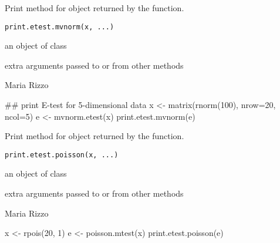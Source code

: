 \documentclass{article}
\begin{document}
\begin{Description}\relax
Print method for  object returned by the 
 function.
\end{Description}
\begin{Usage}
\begin{verbatim}
print.etest.mvnorm(x, ...)
\end{verbatim}
\end{Usage}
\begin{Arguments}
\begin{ldescription}
\item[\code{x}] an object of class  
\item[\code{...}] extra arguments passed to or from other methods 
\end{ldescription}
\end{Arguments}
\begin{Author}\relax
Maria Rizzo 
\end{Author}
\begin{SeeAlso}\relax
{}
\end{SeeAlso}
\begin{Examples}
\begin{ExampleCode}
 ## print E-test for 5-dimensional data
 x <- matrix(rnorm(100), nrow=20, ncol=5)
 e <- mvnorm.etest(x)
 print.etest.mvnorm(e)
 \end{ExampleCode}
\end{Examples}

\begin{Description}\relax
Print method for  object returned by the 
 function.
\end{Description}
\begin{Usage}
\begin{verbatim}
print.etest.poisson(x, ...)
\end{verbatim}
\end{Usage}
\begin{Arguments}
\begin{ldescription}
\item[\code{x}] an object of class  
\item[\code{...}] extra arguments passed to or from other methods 
\end{ldescription}
\end{Arguments}
\begin{Author}\relax
Maria Rizzo 
\end{Author}
\begin{SeeAlso}\relax
{}
\end{SeeAlso}
\begin{Examples}
\begin{ExampleCode}
 x <- rpois(20, 1)
 e <- poisson.mtest(x)
 print.etest.poisson(e)
 \end{ExampleCode}
\end{Examples}
\end{document}
